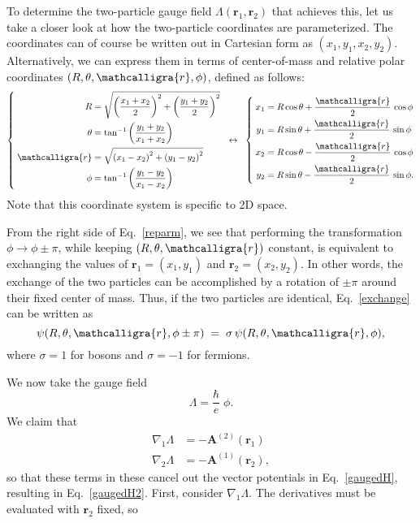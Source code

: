 \documentclass[pra,12pt]{revtex4}
\begin{document}
To determine the two-particle gauge field
$\Lambda(\mathbf{r}_1,\mathbf{r}_2)$ that achieves this, let us take a
closer look at how the two-particle coordinates are parameterized.
The coordinates can of course be written out in Cartesian form as
$(x_1, y_1, x_2, y_2)$.  Alternatively, we can express them in terms
of center-of-mass and relative polar coordinates $(R, \theta,
\mathcalligra{r}, \phi)$, defined as follows:
\begin{align}
  \left\{\;
  \begin{aligned}
  R &= \sqrt{\left(\frac{x_1+x_2}{2}\right)^2 + \left(\frac{y_1+y_2}{2}\right)^2} \\
  \theta &= \tan^{-1}\left(\frac{y_1+y_2}{x_1+x_2}\right) \\
  \mathcalligra{r} &= \sqrt{\left(x_1-x_2\right)^2 + \left(y_1-y_2\right)^2} \\
  \phi &= \tan^{-1}\left(\frac{y_1-y_2}{x_1-x_2}\right)
  \end{aligned}
  \right.
  \;\;\leftrightarrow\;\;
  \left\{ \;
  \begin{aligned}
    x_1 &= R \cos\theta + \frac{\mathcalligra{r}}{2} \,\cos\phi \\
    y_1 &= R \sin\theta + \frac{\mathcalligra{r}}{2} \,\sin\phi \\
    x_2 &= R \cos\theta - \frac{\mathcalligra{r}}{2} \,\cos\phi \\
    y_2 &= R \sin\theta - \frac{\mathcalligra{r}}{2} \,\sin\phi.
  \end{aligned}
  \right.
  \label{reparm}
\end{align}
Note that this coordinate system is specific to 2D space.

From the right side of Eq.~\eqref{reparm}, we see that performing the
transformation $\phi \rightarrow \phi \pm \pi$, while keeping $(R,
\theta, \mathcalligra{r})$ constant, is equivalent to exchanging the
values of $\mathbf{r}_1 = (x_1,y_1)$ and $\mathbf{r}_2 =(x_2,y_2)$.
In other words, the exchange of the two particles can be accomplished
by a rotation of $\pm \pi$ around their fixed center of mass.  Thus,
if the two particles are identical, Eq.~\eqref{exchange} can be
written as
\begin{equation}
  \psi(R, \theta, \mathcalligra{r}, \phi \pm \pi) \;=\;
  \sigma \, \psi(R, \theta, \mathcalligra{r}, \phi),
\end{equation}
where $\sigma = 1$ for bosons and $\sigma = -1$ for fermions.

We now take the gauge field
\begin{equation}
  \Lambda = \frac{\hbar}{e}\; \phi.
\end{equation}
We claim that
\begin{align}
  \nabla_1 \Lambda &= - \mathbf{A}^{(2)}(\mathbf{r}_1) \\
  \nabla_2 \Lambda &= - \mathbf{A}^{(1)}(\mathbf{r}_2),
\end{align}
so that these terms in these cancel out the vector potentials in
Eq.~\eqref{gaugedH}, resulting in Eq.~\eqref{gaugedH2}.  First,
consider $\nabla_1\Lambda$.  The derivatives must be evaluated with
$\mathbf{r}_2$ fixed, so
\end{document}
